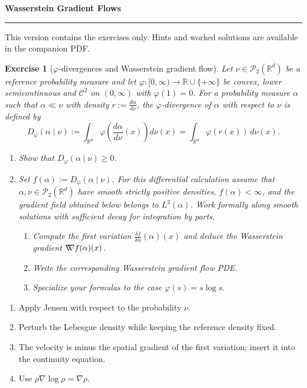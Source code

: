\documentclass[11pt,a4paper]{article}
\theoremstyle{exostyle}
\newtheorem{exercise}{Exercise}
\newif\ifcorr
\newcommand{\R}{\mathbb{R}}
\newcommand{\gradW}{\mathord{\nabla\mkern-9.3mu\nabla}}
\renewcommand{\maketitle}{\thispagestyle{plain}\begingroup
  \color{heading}\LARGE\bfseries\SheetTitle\par\endgroup
  \vspace{3pt}{\large\ifcorr Statements, hints and worked solutions\else Exercise statements\fi}\par
  \vspace{7pt}\hrule\vspace{9pt}
  \ifcorr Each exercise is followed by question-by-question hints and a worked solution.
  Try the questions before reading the hints.\else
  This version contains the exercises only. Hints and worked solutions are available in the companion PDF.\fi
  \par\medskip}
\newcommand{\SheetTitle}{Wasserstein Gradient Flows}
\begin{document}
\maketitle

\begin{exercise}[$\varphi$-divergences and Wasserstein gradient flow]\label{ex:phi-divergence-W2}
Let $\nu\in\mathcal P_2(\R^d)$ be a reference probability measure and let $\varphi:[0,\infty)\to\R\cup\{+\infty\}$ be convex, lower semicontinuous and $\mathcal C^2$ on $(0,\infty)$ with $\varphi(1)=0$. For a probability measure $\alpha$ such that $\alpha\ll\nu$ with density
$r := \frac{d\alpha}{d\nu}$,
the $\varphi$-divergence of $\alpha$ with respect to $\nu$ is defined by
\[
D_\varphi(\alpha\mid\nu) := \int_{\R^d} \varphi\!\left(\frac{d\alpha}{d\nu}(x)\right)d\nu(x)
= \int_{\R^d} \varphi(r(x))\,d\nu(x).
\]

\begin{enumerate}[label=\textbf{(\arabic*)}]
  \item Show that $D_\varphi(\alpha\mid\nu)\ge 0$.

  \item Set $f(\alpha) := D_\varphi(\alpha\mid\nu)$. For this differential
  calculation assume that $\alpha,\nu\in\mathcal P_2(\R^d)$ have smooth
  strictly positive densities, $f(\alpha)<\infty$, and the gradient
  field obtained below belongs to $L^2(\alpha)$. Work formally along
  smooth solutions with sufficient decay for integration by parts.
  \begin{enumerate}[label=\textbf{(\alph*)}]
    \item Compute the first variation $\frac{\delta f}{\delta\alpha}(\alpha)(x)$ and deduce the Wasserstein gradient
    $\gradW f(\alpha)(x)$.

    \item Write the corresponding Wasserstein gradient flow PDE.
    \item Specialize your formulas to the case $\varphi(s) = s\log s$.
  \end{enumerate}
\end{enumerate}
\end{exercise}
\begin{hints}
\begin{enumerate}[label=(\arabic*)]\item Apply Jensen with respect to the probability $\nu$.\item[(2a)] Perturb the Lebesgue density while keeping the reference density fixed.\item[(2b)] The velocity is minus the spatial gradient of the first variation; insert it into the continuity equation.\item[(2c)] Use $\rho\nabla\log\rho=\nabla\rho$.\end{enumerate}
\end{hints}
\end{document}
